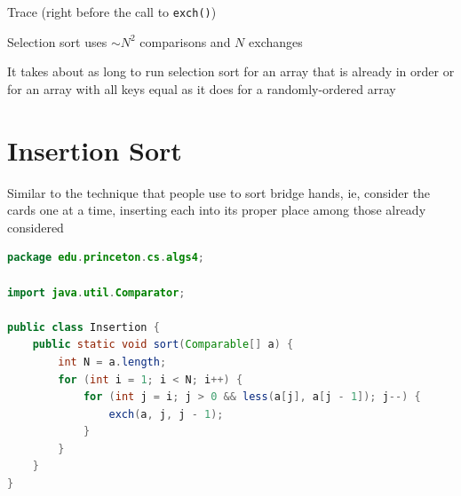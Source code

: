 \documentclass[8pt,a4paper,compress]{beamer}
\begin{document}
\begin{frame}[fragile]
\pause

Trace (right before the call to \lstinline{exch()})
\begin{center}
\end{center}
\end{frame}

\begin{frame}[fragile]
\pause

Selection sort uses $\sim N^2$ comparisons and $N$ exchanges

\pause
\bigskip

It takes about as long to run selection sort for an array that is already in order or for an array with all keys equal as it does for a randomly-ordered array
\end{frame}

\section{Insertion Sort}
\begin{frame}[fragile]
\pause

Similar to the technique that people use to sort bridge hands, ie, consider the cards one at a time, inserting each into its proper place among those already considered

\pause
\bigskip

\begin{lstlisting}[language=Java,style=focusin]
package edu.princeton.cs.algs4;

import java.util.Comparator;

public class Insertion {
    public static void sort(Comparable[] a) {
        int N = a.length;
        for (int i = 1; i < N; i++) {
            for (int j = i; j > 0 && less(a[j], a[j - 1]); j--) {
                exch(a, j, j - 1);
            }
        }
    }
}
\end{lstlisting}
\end{frame}
\end{document}
